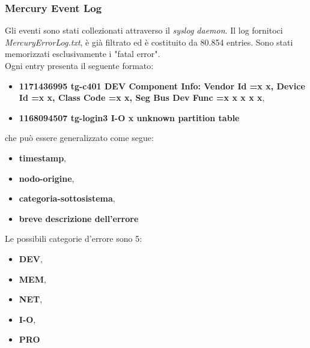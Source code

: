 \subsubsection{Mercury Event Log}
Gli eventi sono stati collezionati attraverso il \textit{syslog daemon}.
Il log fornitoci \textit{MercuryErrorLog.txt}, è già filtrato ed è costituito da 80.854 entries. Sono stati memorizzati esclusivamente i "fatal error".
\\Ogni entry presenta il seguente formato:
\begin{itemize}
	\item \textbf{1171436995 tg-c401 DEV Component Info: Vendor Id =x x, Device Id =x x, Class Code =x x, Seg Bus Dev Func =x x x x x},
	\item \textbf{1168094507 tg-login3 I-O x unknown partition table}
\end{itemize}
che può essere generalizzato come segue:
\\
\begin{itemize}
	\item \textbf{timestamp},
	\item \textbf{nodo-origine},
	\item \textbf{categoria-sottosistema},
	\item \textbf{breve descrizione dell'errore}
\end{itemize}
Le possibili categorie d'errore sono 5:
\begin{itemize}
	\item \textbf{DEV},
	\item \textbf{MEM},
	\item \textbf{NET},
	\item \textbf{I-O},
	\item \textbf{PRO}
\end{itemize}

\newpage

